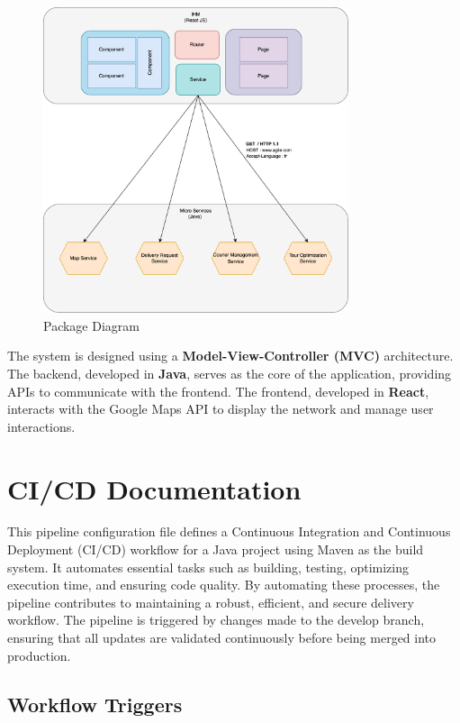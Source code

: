 \documentclass[a4paper]{article}
\begin{document}
\begin{figure}[H]
    \centering
    \includegraphics[width=0.8\textwidth]{images/archi.png}
    \caption{Package Diagram}
\end{figure}
The system is designed using a \textbf{Model-View-Controller (MVC)} architecture. The backend, developed in \textbf{Java}, serves as the core of the application, providing APIs to communicate with the frontend. The frontend, developed in \textbf{React}, interacts with the Google Maps API to display the network and manage user interactions.


\section{CI/CD Documentation}

This pipeline configuration file defines a Continuous Integration and Continuous Deployment (CI/CD) workflow for a Java project using Maven as the build system. It automates essential tasks such as building, testing, optimizing execution time, and ensuring code quality. By automating these processes, the pipeline contributes to maintaining a robust, efficient, and secure delivery workflow. The pipeline is triggered by changes made to the develop branch, ensuring that all updates are validated continuously before being merged into production.

\subsection{Workflow Triggers}
\end{document}
